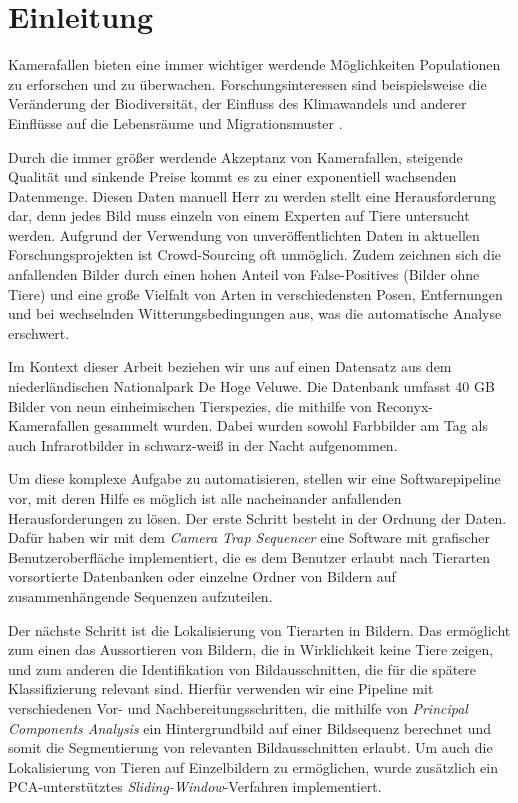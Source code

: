 \newpage
\section{Einleitung}

Kamerafallen bieten eine immer wichtiger werdende Möglichkeiten Populationen zu erforschen und zu überwachen. Forschungsinteressen sind beispielsweise die Veränderung der Biodiversität, der Einfluss des Klimawandels und anderer Einflüsse auf die Lebensräume und Migrationsmuster \cite{ywkjwh13}.

Durch die immer größer werdende Akzeptanz von Kamerafallen, steigende Qualität und sinkende Preise kommt es zu einer exponentiell wachsenden Datenmenge. Diesen Daten manuell Herr zu werden stellt eine Herausforderung dar, denn jedes Bild muss einzeln von einem Experten auf Tiere untersucht werden. Aufgrund der Verwendung von unveröffentlichten Daten in aktuellen Forschungsprojekten ist Crowd-Sourcing oft unmöglich. Zudem zeichnen sich die anfallenden Bilder durch einen hohen Anteil von False-Positives (Bilder ohne Tiere) und eine große Vielfalt von Arten in verschiedensten Posen, Entfernungen und bei wechselnden Witterungsbedingungen aus, was die automatische Analyse erschwert.

Im Kontext dieser Arbeit beziehen wir uns auf einen Datensatz aus dem niederländischen Nationalpark De Hoge Veluwe. Die Datenbank umfasst 40 GB Bilder von neun einheimischen Tierspezies, die mithilfe von Reconyx-Kamerafallen gesammelt wurden. Dabei wurden sowohl Farbbilder am Tag als auch Infrarotbilder in schwarz-weiß in der Nacht aufgenommen.

Um diese komplexe Aufgabe zu automatisieren, stellen wir eine Softwarepipeline vor, mit deren Hilfe es möglich ist alle nacheinander anfallenden Herausforderungen zu lösen. Der erste Schritt besteht in der Ordnung der Daten. Dafür haben wir mit dem \emph{Camera Trap Sequencer} eine Software mit grafischer Benutzeroberfläche implementiert, die es dem Benutzer erlaubt nach Tierarten vorsortierte Datenbanken oder einzelne Ordner von Bildern auf zusammenhängende Sequenzen aufzuteilen.

Der nächste Schritt ist die Lokalisierung von Tierarten in Bildern. Das ermöglicht zum einen das Aussortieren von Bildern, die in Wirklichkeit keine Tiere zeigen, und zum anderen die Identifikation von Bildausschnitten, die für die spätere Klassifizierung relevant sind. Hierfür verwenden wir eine Pipeline mit verschiedenen Vor- und Nachbereitungsschritten, die mithilfe von \emph{Principal Components Analysis} ein Hintergrundbild auf einer Bildsequenz berechnet und somit die Segmentierung von relevanten Bildausschnitten erlaubt. Um auch die Lokalisierung von Tieren auf Einzelbildern zu ermöglichen, wurde zusätzlich ein PCA-unterstütztes \emph{Sliding-Window}-Verfahren implementiert. 

